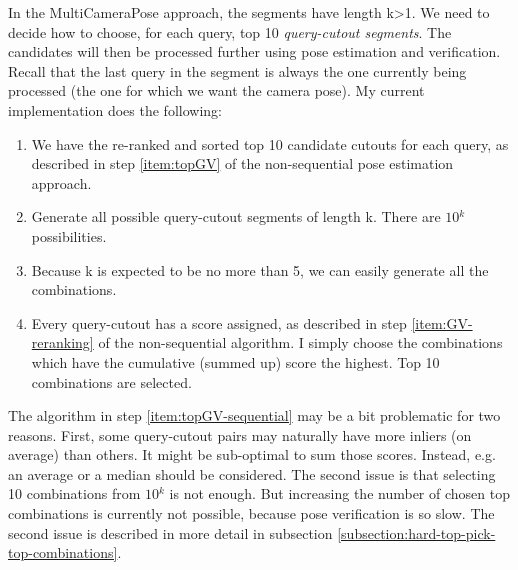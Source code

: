 \documentclass[twoside]{ctuthesis}
\theoremstyle{plain}
\theoremstyle{definition}
\theoremstyle{note}
\newcommand{\topGV}{10} %
\newcommand{\topPE}{10} %
\begin{document}
In the MultiCameraPose approach, the segments have length k>1. We need to decide how to choose, for each query, top \topPE{} \emph{query-cutout segments}. The candidates will then be processed further using pose estimation and verification. Recall that the last query in the segment is always the one currently being processed (the one for which we want the camera pose). My current implementation does the following:

\begin{enumerate}
	\item We have the re-ranked and sorted top \topGV{} candidate cutouts for each query, as described in step \ref{item:topGV} of the non-sequential pose estimation approach.
	\item Generate all possible query-cutout segments of length k. There are $\topGV{}^{k}$ possibilities.
	\item Because k is expected to be no more than 5, we can easily generate all the combinations.
	\item \label{item:topGV-sequential} Every query-cutout has a score assigned, as described in step \ref{item:GV-reranking} of the non-sequential algorithm. I simply choose the combinations which have the cumulative (summed up) score the highest. Top \topPE{} combinations are selected.
\end{enumerate}

The algorithm in step \ref{item:topGV-sequential} may be a bit problematic for two reasons. First, some query-cutout pairs may naturally have more inliers (on average) than others. It might be sub-optimal to sum those scores. Instead, e.g. an average or a median should be considered. The second issue is that selecting \topPE{} combinations from $\topGV{}^{k}$ is not enough. But increasing the number of chosen top combinations is currently not possible, because pose verification is so slow. The second issue is described in more detail in subsection \ref{subsection:hard-top-pick-top-combinations}.
\end{document}
